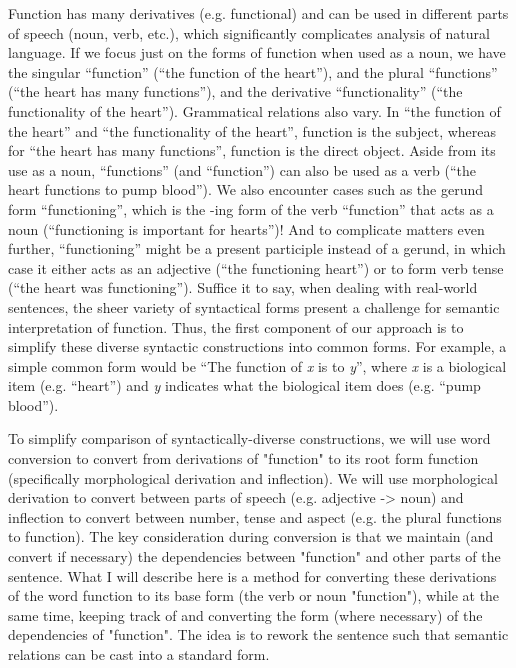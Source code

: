 \documentclass{article}
\begin{document}
Function has many derivatives (e.g. functional) and can be used in different parts of speech (noun, verb, etc.), which significantly complicates analysis of natural language.
If we focus just on the forms of function when used as a noun, we have the singular ``function'' (``the function of the heart''), and the plural ``functions'' (``the heart has many functions''), and the derivative ``functionality'' (``the functionality of the heart'').
Grammatical relations also vary.
In ``the function of the heart'' and ``the functionality of the heart'', function is the subject, whereas for ``the heart has many functions'', function is the direct object.
Aside from its use as a noun, ``functions'' (and ``function'') can also be used as a verb (``the heart functions to pump blood'').
We also encounter cases such as the gerund form ``functioning'', which is the -ing form of the verb ``function'' that acts as a noun (``functioning is important for hearts'')!
And to complicate matters even further, ``functioning'' might be a present participle instead of a gerund, in which case it either acts as an adjective (``the functioning heart'') or to form verb tense (``the heart was functioning''). Suffice it to say, when dealing with real-world sentences, the sheer variety of syntactical forms present a challenge for semantic interpretation of function.
Thus, the first component of our approach is to simplify these diverse syntactic constructions into common forms.
For example, a simple common form would be ``The function of \emph{x} is to \emph{y}'', where \emph{x} is a biological item (e.g. ``heart'') and \emph{y} indicates what the biological item does (e.g. ``pump blood'').

To simplify comparison of syntactically-diverse constructions, we will use word conversion to convert from derivations of "function" to its root form function (specifically morphological derivation and inflection). We will use morphological derivation to convert between parts of speech (e.g. adjective -> noun) and inflection to convert between number, tense and aspect (e.g. the plural functions to function). The key consideration during conversion is that we maintain (and convert if necessary) the dependencies between "function" and other parts of the sentence. What I will describe here is a method for converting these derivations of the word function to its base form (the verb or noun "function"), while at the same time, keeping track of and converting the form (where necessary) of the dependencies of "function". The idea is to rework the sentence such that semantic relations can be cast into a standard form.
\end{document}
